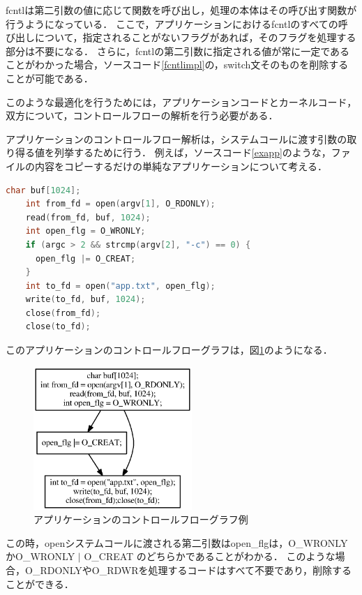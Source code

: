\documentclass[graduation-thesis]{mlarticle}
\begin{document}
fcntlは第二引数の値に応じて関数を呼び出し，処理の本体はその呼び出す関数が行うようになっている．
ここで，アプリケーションにおけるfcntlのすべての呼び出しについて，指定されることがないフラグがあれば，そのフラグを処理する部分は不要になる．
さらに，fcntlの第二引数に指定される値が常に一定であることがわかった場合，ソースコード\ref{fcntlimpl}の，switch文そのものを削除することが可能である．

このような最適化を行うためには，アプリケーションコードとカーネルコード，双方について，コントロールフローの解析を行う必要がある．

アプリケーションのコントロールフロー解析は，システムコールに渡す引数の取り得る値を列挙するために行う．
例えば，ソースコード\ref{exapp}のような，ファイルの内容をコピーするだけの単純なアプリケーションについて考える．

\begin{lstlisting}[language=C, caption=アプリケーションの例, label=exapp]
    char buf[1024];
    int from_fd = open(argv[1], O_RDONLY);
    read(from_fd, buf, 1024);
    int open_flg = O_WRONLY;
    if (argc > 2 && strcmp(argv[2], "-c") == 0) {
      open_flg |= O_CREAT;
    }
    int to_fd = open("app.txt", open_flg);
    write(to_fd, buf, 1024);
    close(from_fd);
    close(to_fd);
\end{lstlisting}

このアプリケーションのコントロールフローグラフは，図\ref{fig:controlflow}のようになる．

\begin{figure}[H]
  \begin{center}
    \includegraphics[width=6.0cm]{images/controlflow.eps}
    \caption{アプリケーションのコントロールフローグラフ例}
    \label{fig:controlflow}
  \end{center}
\end{figure}

この時，openシステムコールに渡される第二引数はopen\_flgは，O\_WRONLYかO\_WRONLY $|$ O\_CREAT のどちらかであることがわかる．
このような場合，O\_RDONLYやO\_RDWRを処理するコードはすべて不要であり，削除することができる．
\end{document}
